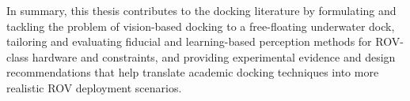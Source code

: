 In summary, this thesis contributes to the docking literature by formulating and tackling the problem of vision-based docking to a free-floating underwater dock, tailoring and evaluating fiducial and learning-based perception methods for ROV-class hardware and constraints, and providing experimental evidence and design recommendations that help translate academic docking techniques into more realistic ROV deployment scenarios.